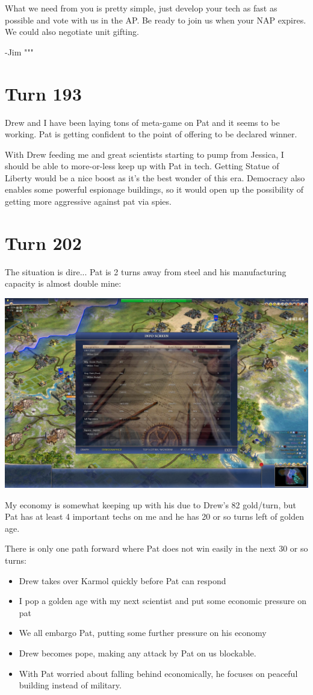 \documentclass[10pt]{article}
\begin{document}
What we need from you is pretty simple, just develop your tech as fast
as possible and vote with us in the AP. Be ready to join us when your
NAP expires. We could also negotiate unit gifting.

-Jim
"""

\section*{Turn 193}

Drew and I have been laying tons of meta-game on Pat and it seems to
be working. Pat is getting confident to the point of offering to be
declared winner.

With Drew feeding me and great scientists starting to pump from
Jessica, I should be able to more-or-less keep up with Pat in
tech. Getting Statue of Liberty would be a nice boost as it's the best
wonder of this era. Democracy also enables some powerful espionage
buildings, so it would open up the possibility of getting more
aggressive against pat via spies.

\section*{Turn 202}

The situation is dire... Pat is 2 turns away from steel and his
manufacturing capacity is almost double mine:

\includegraphics[width=1.0\textwidth]{turn202}

My economy is somewhat keeping up with his due to Drew's 82 gold/turn,
but Pat has at least 4 important techs on me and he has 20 or so turns
left of golden age.

There is only one path forward where Pat does not win easily in the next 30 or so turns:
\begin{itemize}
\item Drew takes over Karmol quickly before Pat can respond
\item I pop a golden age with my next scientist and put some economic pressure on pat
\item We all embargo Pat, putting some further pressure on his economy
\item Drew becomes pope, making any attack by Pat on us blockable.
\item With Pat worried about falling behind economically, he focuses on peaceful building instead of military.
\end{itemize}
\end{document}
